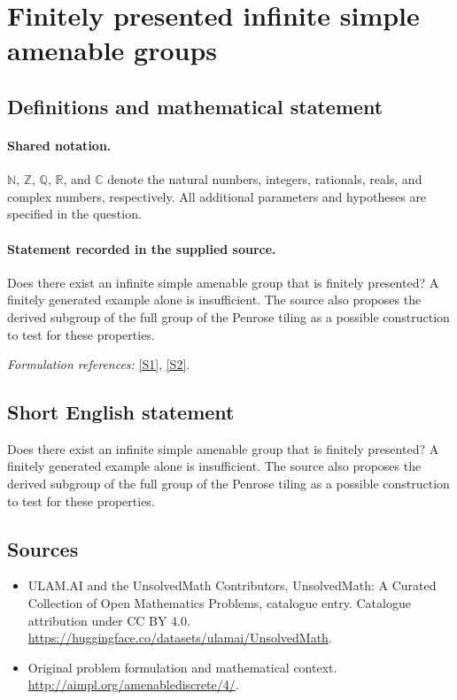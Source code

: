 \documentclass[11pt]{article}
\newcommand{\sref}[2]{\hyperlink{source:#1:#2}{[S#2]}}
\begin{document}
\section{Finitely presented infinite simple amenable groups}\label{statement}

\subsection{Definitions and mathematical statement}

\paragraph{Shared notation.}$\mathbb N$, $\mathbb Z$, $\mathbb Q$, $\mathbb R$, and $\mathbb C$ denote the natural numbers, integers, rationals, reals, and complex numbers, respectively. All additional parameters and hypotheses are specified in the question.


\paragraph{Statement recorded in the supplied source.}
Does there exist an infinite simple amenable group that is finitely presented? A finitely generated example alone is insufficient. The source also proposes the derived subgroup of the full group of the Penrose tiling as a possible construction to test for these properties.
\par\smallskip\textit{Formulation references:} \sref{statement}{1}, \sref{statement}{2}.
\subsection{Short English statement}
Does there exist an infinite simple amenable group that is finitely presented? A finitely generated example alone is insufficient. The source also proposes the derived subgroup of the full group of the Penrose tiling as a possible construction to test for these properties.
\subsection{Sources}
\begin{itemize}
\item[\hypertarget{source:statement:1}{S1}] ULAM.AI and the UnsolvedMath Contributors, UnsolvedMath: A Curated Collection of Open Mathematics Problems, catalogue entry. Catalogue attribution under CC BY 4.0.
\url{https://huggingface.co/datasets/ulamai/UnsolvedMath}.
\item[\hypertarget{source:statement:2}{S2}] Original problem formulation and mathematical context.
\url{http://aimpl.org/amenablediscrete/4/}.
\end{itemize}
\label{end:statement}
\end{document}
